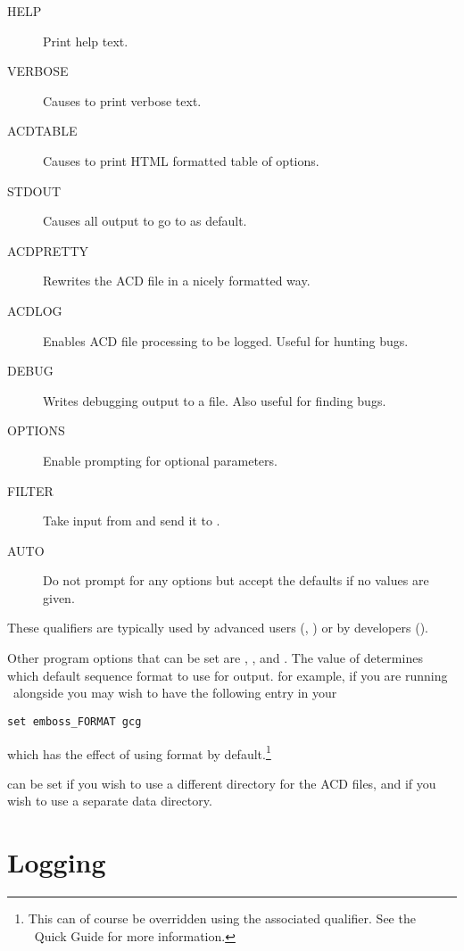 \documentclass{report}
\begin{document}
\begin{description}
\item[HELP] Print help text.
\item[VERBOSE] Causes  to print verbose text.
\item[ACDTABLE] Causes  to print HTML formatted table of options.
\item[STDOUT] Causes all output to go to  as default.
\item[ACDPRETTY] Rewrites the ACD file in a nicely formatted way.
\item[ACDLOG] Enables ACD file processing to be logged. Useful for hunting bugs.
\item[DEBUG] Writes debugging output to a file. Also useful for finding bugs.
\item[OPTIONS] Enable prompting for optional parameters.
\item[FILTER] Take input from  and send it to .
\item[AUTO] Do not prompt for any options but accept the defaults if no values are given.
\end{description}

These qualifiers are typically used by advanced users (, ) or by developers ().


Other program options that can be set are , , and . The value of  determines which default sequence format to use for output. for example, if you are running \EMBOSS\ alongside  you may wish to have the following entry in your 
\begin{verbatim}
set emboss_FORMAT gcg
\end{verbatim}
which has the effect of using  format by default.\footnote{This can of course be overridden using the  associated qualifier. See the \EMBOSS\ Quick Guide for more information.}

  can be set if you wish to use a different directory for the ACD files, and   if you wish to use a separate data directory.


\section{Logging}
\end{document}
